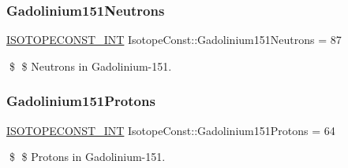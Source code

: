 \subsubsection{\texorpdfstring{Gadolinium151\+Neutrons}{Gadolinium151Neutrons}}
{\footnotesize\ttfamily \mbox{\hyperlink{group___isotope_const-_macros_ga5f18360b3e99483a35c32d789e62621c}{I\+S\+O\+T\+O\+P\+E\+C\+O\+N\+S\+T\+\_\+\+I\+NT}} Isotope\+Const\+::\+Gadolinium151\+Neutrons = 87}

\$ \$ Neutrons in Gadolinium-\/151. \mbox{\label{group___isotope_const-_gadolinium-_gd151_gaf8636b091a9a3ab0579c2837e5fab7bf}} 
\subsubsection{\texorpdfstring{Gadolinium151\+Protons}{Gadolinium151Protons}}
{\footnotesize\ttfamily \mbox{\hyperlink{group___isotope_const-_macros_ga5f18360b3e99483a35c32d789e62621c}{I\+S\+O\+T\+O\+P\+E\+C\+O\+N\+S\+T\+\_\+\+I\+NT}} Isotope\+Const\+::\+Gadolinium151\+Protons = 64}

\$ \$ Protons in Gadolinium-\/151. 